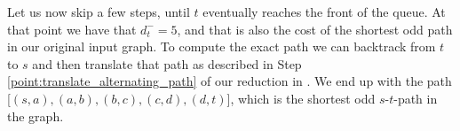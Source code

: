 Let us now skip a few steps, until $t$ eventually reaches the front of the queue. At that point we have that $d^-_t = 5$, and that is also the cost of the shortest odd path in our original input graph. To compute the exact path we can backtrack from $t$ to $s$ and then translate that path as described in Step \ref{point:translate_alternating_path} of our reduction in . We end up with the path [$(s,a),(a,b),(b,c),(c,d),(d,t)$], which is the shortest odd $s$-$t$-path in the graph.
